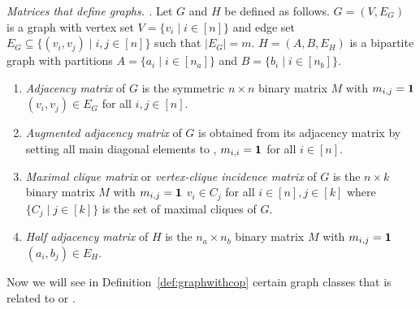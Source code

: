\begin{definition}
  {\em Matrices that define graphs. \cite[Def.~2.4]{d08phd}.}  
  \label{def:graphmatrices} 
  Let $G$ and $H$ be defined as follows. $G = (V,E_G)$ is a graph with
  vertex set $V = \{v_i \mid i \in [n]\}$ and edge set $E_G \subseteq
  \{(v_i,v_j) \mid i, j \in [n]\}$ such that $|E_G| = m$. $H = (A, B,
  E_H)$ is a bipartite graph with partitions $A = \{a_i \mid i \in
  [n_a]\}$ and $B = \{b_i \mid i \in [n_b]\}$.
  \begin{enumerate}
  \item \emph{Adjacency matrix} of $G$ is the symmetric $n \times n$
    binary matrix $M$ with $m_{i,j} = \textbf{1}$ \iff $(v_i,v_j) \in E_G$
    for all $i,j \in [n]$.
  \item \emph{Augmented adjacency matrix} of $G$ is obtained from its
    adjacency matrix by setting all main diagonal elements to \un, \ie
    $m_{i,i} = \textbf{1}$ for all $i \in [n]$.
  \item \emph{Maximal clique matrix} or \emph{vertex-clique incidence
      matrix} of $G$ is the $n \times k$ binary matrix $M$ with
    $m_{i,j} = \textbf{1}$ \iff $v_i \in C_j$ for all $i \in [n], j \in [k]$
    where $\{C_j \mid j \in [k]\}$ is the set of maximal cliques of
    $G$.
    \label{def::maxcliquematrix}
  \item \emph{Half adjacency matrix} of $H$ is the $n_a \times n_b$
    binary matrix $M$ with $m_{i,j} = \textbf{1}$ \iff $(a_i, b_j) \in E_H$.
  \end{enumerate}
\end{definition}

\figgraphmatrices

Now we will see in Definition~\ref{def:graphwithcop} certain graph
classes that is related to \COP or \CROP.\\

